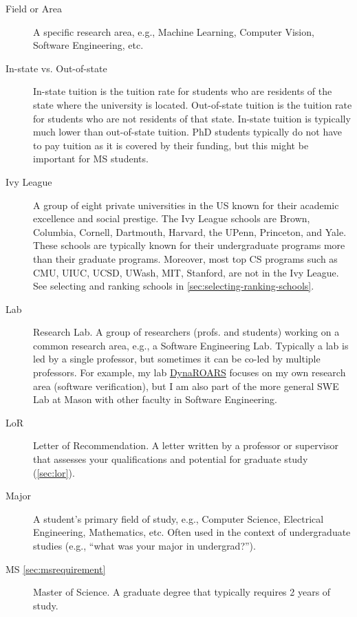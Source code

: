 \documentclass[oneside,11pt,dvipsnames]{book}
\begin{document}
\begin{description}
  \item[Field or Area] A specific research area, e.g., Machine Learning, Computer Vision, Software Engineering, etc.
  
  \item [In-state vs. Out-of-state] In-state tuition is the tuition rate for students who are residents of the state where the university is located. Out-of-state tuition is the tuition rate for students who are not residents of that state. In-state tuition is typically much lower than out-of-state tuition. PhD students typically do not have to pay tuition as it is covered by their funding, but this might be important for MS students.
  
  \item [Ivy League] A group of eight private universities in the US known for their academic excellence and social prestige. The Ivy League schools are Brown, Columbia, Cornell, Dartmouth, Harvard, the UPenn, Princeton, and Yale. These schools are typically known for their undergraduate programs more than their graduate programs. Moreover, most top CS programs such as CMU, UIUC, UCSD, UWash, MIT, Stanford, are not in the Ivy League. See selecting and ranking schools in \autoref{sec:selecting-ranking-schools}.

  \item [Lab] Research Lab. A group of researchers (profs. and students) working on a common research area, e.g., a Software Engineering Lab.  Typically a lab is led by a single professor, but sometimes it can be co-led by multiple professors. For example, my lab \href{https://dynaroars.cs.gmu.edu}{DynaROARS} focuses on my own research area (software verification), but I am also part of the more general SWE Lab at Mason with other faculty in Software Engineering.



  \item[LoR] Letter of Recommendation. A letter written by a professor or supervisor that assesses your qualifications and potential for graduate study (\autoref{sec:lor}).

  \item[Major] A student's primary field of study, e.g., Computer Science, Electrical Engineering, Mathematics, etc. Often used in the context of undergraduate studies (e.g., ``what was your major in undergrad?'').

  \item[MS \autoref{sec:msrequirement}] Master of Science. A graduate degree that typically requires 2 years of study.


\end{description}
\end{document}
